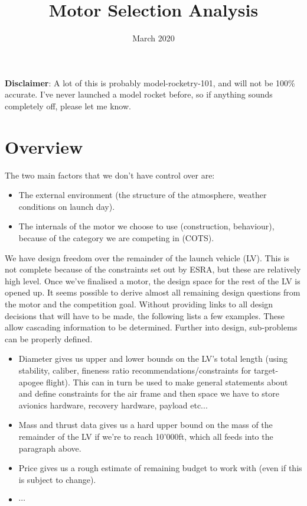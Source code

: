 \documentclass[11pt,table]{article}
\title{Motor Selection Analysis}
\date{March 2020}
\begin{document}
\maketitle

\textbf{Disclaimer}: A lot of this is probably model-rocketry-101, and will not be 100\% accurate. I've never launched a
model rocket before, so if anything sounds completely off, please let me know.

\section*{Overview}
The two main factors that we don't have control over are:

\begin{itemize}
	\item The external environment (the structure of the atmosphere, weather conditions on launch day).
	\item The internals of the motor we choose to use (construction, behaviour), because of the category we are
		competing in (COTS).
\end{itemize}

We have design freedom over the remainder of the launch vehicle (LV). This is not complete because of the constraints
set out by ESRA, but these are relatively high level. Once we've finalised a motor, the design space for the rest of the
LV is opened up. It seems possible to derive almost all remaining design questions from the motor and the competition
goal. Without providing links to all design decisions that will have to be made, the following lists a few examples.
These allow cascading information to be determined. Further into design, sub-problems can be properly defined.

\begin{itemize}
	\item Diameter gives us upper and lower bounds on the LV's total length (using stability, caliber, fineness ratio
		recommendations/constraints for target-apogee flight). This can in turn be used to make general statements about
		and define constraints for the air frame and then space we have to store avionics hardware, recovery hardware,
		payload etc...

	\item Mass and thrust data gives us a hard upper bound on the mass of the remainder of the LV if we're to reach
		10'000ft, which all feeds into the paragraph above.

	\item Price gives us a rough estimate of remaining budget to work with (even if this is subject to change).    

	\item $\cdots$
\end{itemize}
\end{document}

